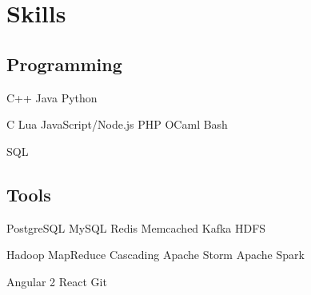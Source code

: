 \documentclass[]{resume}
\begin{document}
\begin{minipage}[t]{0.33\textwidth}
\sectionsep


\section{Skills}

\subsection{Programming}

C++ \textbullet{} Java \textbullet{} Python

C \textbullet{} Lua \textbullet{} JavaScript/Node.js \textbullet{} PHP
\textbullet{} OCaml \textbullet{} Bash

SQL

\sectionsep

\subsection{Tools}

PostgreSQL \textbullet{} MySQL \textbullet{} Redis \textbullet{} Memcached
\textbullet{} Kafka \textbullet{} HDFS

Hadoop MapReduce \textbullet{} Cascading \textbullet{} Apache Storm
\textbullet{} Apache Spark

Angular 2 \textbullet{} React \textbullet{} Git

\sectionsep

%
%

\end{minipage}
\hfill
\end{document}

